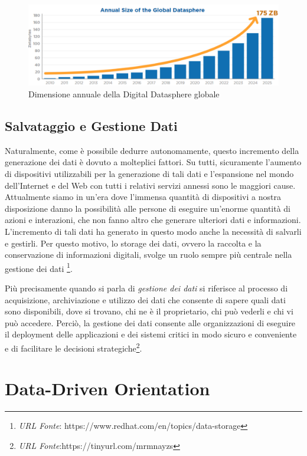 \begin{figure}[H]
    \centering
    \includegraphics[width=1\linewidth]{figure/capitolo_1/Annual Size Global Datasphere.pdf}
    \caption{Dimensione annuale della Digital Datasphere globale}
    \label{fig:Annual Size Global Datasphere}
\end{figure}

\subsection{Salvataggio e Gestione Dati}

Naturalmente, come è possibile dedurre autonomamente, questo incremento della generazione dei dati è dovuto a molteplici fattori. Su tutti, sicuramente l'aumento di dispositivi utilizzabili per la generazione di tali dati e l'espansione nel mondo dell'Internet e del Web con tutti i relativi servizi annessi sono le maggiori cause. Attualmente siamo in un'era dove l'immensa quantità di dispositivi a nostra disposizione danno la possibilità alle persone di eseguire un'enorme quantità di azioni e interazioni, che non fanno altro che generare ulteriori dati e informazioni. L'incremento di tali dati ha generato in questo modo anche la necessità di salvarli e gestirli. Per questo motivo, lo storage dei dati, ovvero la raccolta e la conservazione di informazioni digitali, svolge un ruolo sempre più centrale nella gestione dei dati \footnote{\textit{URL Fonte}: https://www.redhat.com/en/topics/data-storage}.

Più precisamente quando si parla di \textit{gestione dei dati} si riferisce al processo di acquisizione, archiviazione e utilizzo dei dati che consente di sapere quali dati sono disponibili, dove si trovano, chi ne è il proprietario, chi può vederli e chi vi può accedere. Perciò, la gestione dei dati consente alle organizzazioni di eseguire il deployment delle applicazioni e dei sistemi critici in modo sicuro e conveniente e di facilitare le decisioni strategiche\footnote{\textit{URL Fonte}:https://tinyurl.com/mrmnayzs}.

\section{Data-Driven Orientation}

